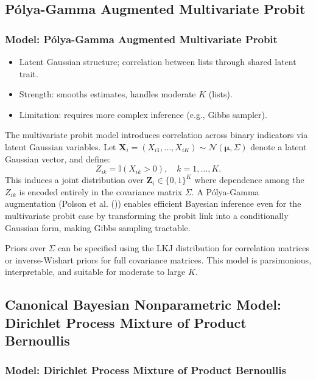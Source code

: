 \documentclass[
  12pt,
]{article}
\providecommand{\tightlist}{%
  \setlength{\itemsep}{0pt}\setlength{\parskip}{0pt}}\usepackage{longtable,booktabs,array}
\theoremstyle{plain}
\theoremstyle{definition}
\begin{document}
\subsection{Pólya-Gamma Augmented Multivariate
Probit}\label{puxf3lya-gamma-augmented-multivariate-probit}

\subsubsection{Model: Pólya-Gamma Augmented Multivariate
Probit}\label{model-puxf3lya-gamma-augmented-multivariate-probit}

\begin{itemize}
\tightlist
\item
  Latent Gaussian structure; correlation between lists through shared
  latent trait.
\item
  Strength: smooths estimates, handles moderate \(K\) (lists).
\item
  Limitation: requires more complex inference (e.g., Gibbs sampler).
\end{itemize}

The multivariate probit model introduces correlation across binary
indicators via latent Gaussian variables. Let
\(\mathbf{X}_i = (X_{i1}, \ldots, X_{iK}) \sim \mathcal{N}(\boldsymbol{\mu}, \Sigma)\)
denote a latent Gaussian vector, and define: \[
Z_{ik} = \mathbb{I}(X_{ik} > 0), \quad k = 1, \ldots, K.
\] This induces a joint distribution over \(\mathbf{Z}_i \in \{0,1\}^K\)
where dependence among the \(Z_{ik}\) is encoded entirely in the
covariance matrix \(\Sigma\). A Pólya-Gamma augmentation (Polson et al.
()) enables efficient Bayesian
inference even for the multivariate probit case by transforming the
probit link into a conditionally Gaussian form, making Gibbs sampling
tractable.

Priors over \(\Sigma\) can be specified using the LKJ distribution for
correlation matrices or inverse-Wishart priors for full covariance
matrices. This model is parsimonious, interpretable, and suitable for
moderate to large \(K\).

\subsection{Canonical Bayesian Nonparametric Model: Dirichlet Process
Mixture of Product
Bernoullis}\label{canonical-bayesian-nonparametric-model-dirichlet-process-mixture-of-product-bernoullis}

\subsubsection{Model: Dirichlet Process Mixture of Product
Bernoullis}\label{model-dirichlet-process-mixture-of-product-bernoullis}
\end{document}
